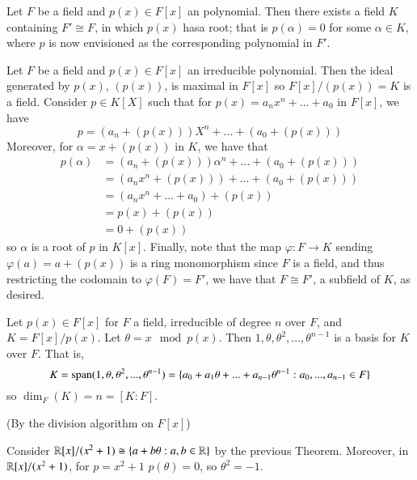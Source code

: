\documentclass[12pt, a4paper, twoside, openright, titlepage]{book}
\begin{document}
\begin{thm}{}{}
    Let $F$ be a field and $p(x) \in F[x]$ an  polynomial. Then there exists a field $K$ containing $F' \cong F$, in which $p(x)$ hasa root; that is $p(\alpha) = 0$ for some $\alpha \in K$, where $p$ is now envisioned as the corresponding polynomial in $F'$.
\end{thm}
\begin{proof*}{}{}
    Let $F$ be a field and $p(x) \in F[x]$ an irreducible polynomial. Then the ideal generated by $p(x)$, $(p(x))$, is maximal in $F[x]$ so $F[x]/(p(x)) = K$ is a field. Consider $p \in K[X]$ such that for $p(x) = a_nx^n+...+a_0$ in $F[x]$, we have $$p = (a_n+(p(x)))X^n+...+(a_0+(p(x)))$$  Moreover, for $\alpha = x + (p(x))$ in $K$, we have that \begin{align*}
        p(\alpha) &= (a_n+(p(x)))\alpha^n+...+(a_0+(p(x))) \\
        &= (a_nx^n+(p(x))) + ... + (a_0+(p(x))) \\
        &= (a_nx^n+...+a_0) + (p(x)) \\
        &= p(x) + (p(x)) \\
        &= 0 + (p(x))
    \end{align*}
    so $\alpha$ is a root of $p$ in $K[x]$. Finally, note that the map $\varphi:F\rightarrow K$ sending $\varphi(a) = a+(p(x))$ is a ring monomorphism since $F$ is a field, and thus restricting the codomain to $\varphi(F) = F'$, we have that $F \cong F'$, a subfield of $K$, as desired.
\end{proof*}


\begin{thm}{}{}
    Let $p(x) \in F[x]$ for $F$ a field, irreducible of degree $n$ over $F$, and $K = F[x]/p(x)$. Let $\theta = x\mod p(x)$. Then $1,\theta,\theta^2,...,\theta^{n-1}$ is a basis for $K$ over $F$. That is, \begin{equation}
        K = \operatorname{span}(1,\theta,\theta^2,...,\theta^{n-1}) = \{a_0+a_1\theta+...+a_{n-1}\theta^{n-1}:a_0,...,a_{n-1} \in F\}
    \end{equation}
    so $\dim_F(K) = n = [K:F]$.
\end{thm}
\begin{proof*}{}{}
    (By the division algorithm on $F[x]$)
\end{proof*}


\begin{eg}{}{}
    Consider $\mathbb R[x]/(x^2+1) \cong \{a+b\theta:a,b \in \mathbb R\}$ by the previous Theorem. Moreover, in $\mathbb R[x]/(x^2+1)$, for $p = x^2+1$ $p(\theta) = 0$, so $\theta^2 = -1$.
\end{eg}
\end{document}
